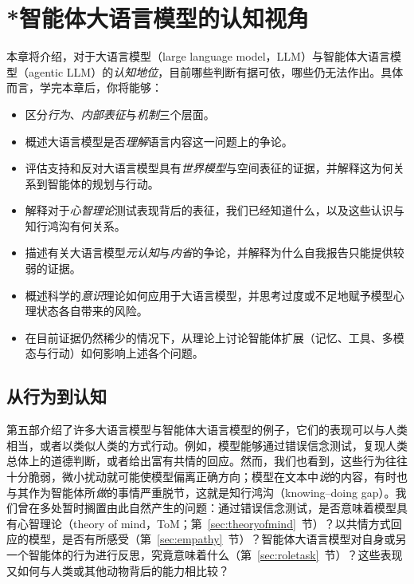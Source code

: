 \chapter{*智能体大语言模型的认知视角}\label{chap:cognition}


\begin{learningbox}
本章将介绍，对于大语言模型（large language model，LLM）与智能体大语言模型（agentic LLM）的\emph{认知地位}，目前哪些判断有据可依，哪些仍无法作出。具体而言，学完本章后，你将能够：
\begin{itemize}
    \item 区分\emph{行为}、\emph{内部表征}与\emph{机制}三个层面。
    \item 概述大语言模型是否\emph{理解}语言内容这一问题上的争论。
    \item 评估支持和反对大语言模型具有\emph{世界模型}与空间表征的证据，并解释这为何关系到智能体的规划与行动。
    \item 解释对于\emph{心智理论}测试表现背后的表征，我们已经知道什么，以及这些认识与知行鸿沟有何关系。
    \item 描述有关大语言模型\emph{元认知}与\emph{内省}的争论，并解释为什么自我报告只能提供较弱的证据。
    \item 概述科学的\emph{意识}理论如何应用于大语言模型，并思考过度或不足地赋予模型心理状态各自带来的风险。
    \item 在目前证据仍然稀少的情况下，从理论上讨论智能体扩展（记忆、工具、多模态与行动）如何影响上述各个问题。
\end{itemize}
\end{learningbox}

\section{从行为到认知}
第五部介绍了许多大语言模型与智能体大语言模型的例子，它们的表现可以与人类相当，或者以类似人类的方式行动。例如，模型能够通过错误信念测试，复现人类总体上的道德判断，或者给出富有共情的回应。然而，我们也看到，这些行为往往十分脆弱，微小扰动就可能使模型偏离正确方向；模型在文本中\emph{说}的内容，有时也与其作为智能体所\emph{做}的事情严重脱节，这就是知行鸿沟（knowing--doing gap）。我们曾在多处暂时搁置由此自然产生的问题：通过错误信念测试，是否意味着模型具有心智理论（theory of mind，ToM；第~\ref{sec:theoryofmind}~节）？以共情方式回应的模型，是否有所感受（第~\ref{sec:empathy}~节）？智能体大语言模型对自身或另一个智能体的行为进行反思，究竟意味着什么（第~\ref{sec:roletask}~节）？这些表现又如何与人类或其他动物背后的能力相比较？

